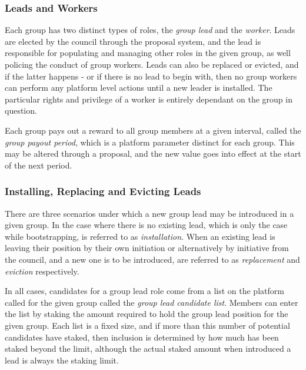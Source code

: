 \documentclass{article}
\begin{document}
\subsubsection{Leads and Workers}

Each group has two distinct types of roles, the \textit{group lead} and the \textit{worker}. Leads are elected by the council through the proposal system, and the lead is responsible for populating and managing other roles in the given group, as well policing the conduct of group workers. Leads can also be replaced or evicted, and if the latter happens - or if there is no lead to begin with, then no group workers can perform any platform level actions until a new leader is installed. The particular rights and privilege of a worker is entirely dependant on the group in question.

Each group pays out a reward to all group members at a given interval, called the \textit{group payout period}, which is a platform parameter distinct for each group. This may be altered through a proposal, and the new value goes into effect at the start of the next period.

\subsubsection{Installing, Replacing and Evicting Leads}

There are three scenarios under which a new group lead may be introduced in a given group. In the case where there is no existing lead, which is only the case while bootstrapping, is referred to as \textit{installation}. When an existing lead is leaving their position by their own initiation or alternatively by initiative from the council, and a new one is to be introduced, are referred to as \textit{replacement} and \textit{eviction} respectively.

In all cases, candidates for a group lead role come from a list on the platform called for the given group called the \textit{group lead candidate list}. Members can enter the list by staking the amount required to hold the group lead position for the given group. Each list is a fixed size, and if more than this number of potential candidates have staked, then inclusion is determined by how much has been staked beyond the limit, although the actual staked amount when introduced a lead is always the staking limit.

\end{document}
